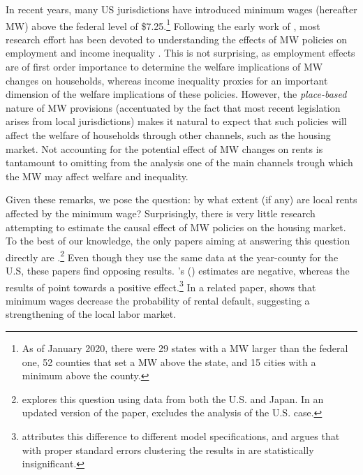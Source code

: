 
In recent years, many US jurisdictions have introduced minimum wages (hereafter MW) above the 
federal level of \$7.25.\footnote{As of January 2020, there were 29 states with a MW larger 
	than the federal one, 52 counties that set a MW above the state, and 15 cities with a 
	minimum above the county.}
Following the early work of \textcite{CardKrueger2000}, most research effort has been devoted 
to understanding the effects of MW policies on employment \parencite[e.g.,][]{Neumark2006, 
DubeEtAl2010, MeerWest2016, CegnizEtAl2019} and income inequality \parencite{Lee1999, 
AutorEtAl2016}. This is not surprising, as employment effects are of first order importance 
to determine the welfare implications of MW changes on households, whereas income inequality 
proxies for an important dimension of the welfare implications of these policies. However, the 
\textit{place-based} nature of MW provisions (accentuated by the fact that most recent 
legislation arises from local jurisdictions) makes it natural to expect that such policies 
will affect the welfare of households through other channels, such as the housing market. 
Not accounting for the potential effect of MW changes on rents is tantamount to omitting 
from the analysis one of the main channels trough which the MW may affect welfare and inequality.

Given these remarks, we pose the question: by what extent (if any) are local rents affected 
by the minimum wage? Surprisingly, there is very little research attempting to estimate 
the causal effect of MW policies on the housing market. To the best of our knowledge, the 
only papers aiming at answering this question directly are \textcite{Tidemann2018, Yamagishi2019, 
Yamagishi2020}.\footnote{\textcite{Yamagishi2019} explores this question using 
data from both the U.S. and Japan. In an updated version of the paper, 
\textcite{Yamagishi2020} excludes the analysis of the U.S. case.} Even though they use the 
same data at the year-county for the U.S, these papers find opposing results. 
\citeauthor{Tidemann2018}'s (\citeyear{Tidemann2018}) estimates are negative, whereas the 
results of \textcite{Yamagishi2019} point towards a positive effect.\footnote{
	\textcite{Yamagishi2019} attributes this difference to different model 
	specifications, and argues that with proper standard errors clustering the results in 
	\textcite{Tidemann2018} are statistically insignificant.} 
In a related paper, \textcite{AgarwalEtAl2019} shows that minimum wages decrease 
the probability of rental default, suggesting a strengthening of the local labor market.

